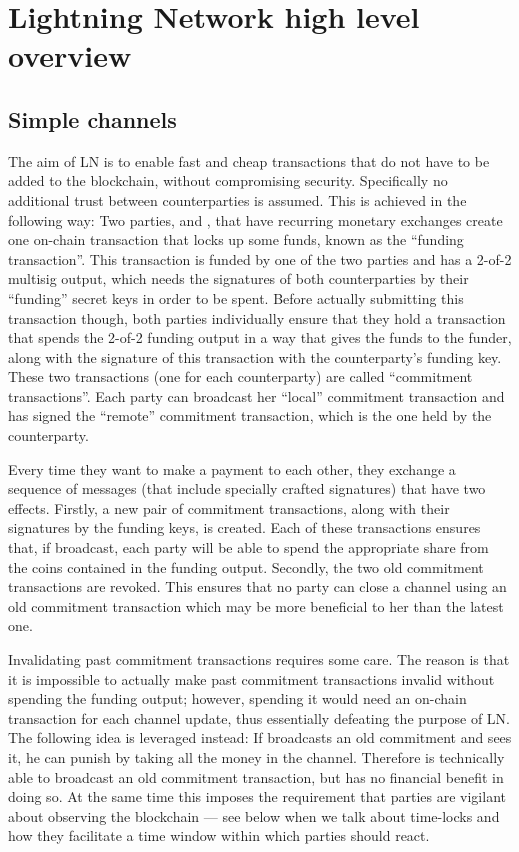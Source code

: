 \section{Lightning Network high level overview}
  \subsection{Simple channels}
    The aim of LN is to enable fast and cheap transactions that do not have to
    be added to the blockchain, without compromising security. Specifically no
    additional trust between counterparties is assumed. This is achieved in the
    following way: Two parties, \alice{} and \bob, that have recurring monetary
    exchanges create one on-chain transaction that locks up some funds, known as
    the ``funding transaction''. This transaction is funded by one of the two
    parties and has a 2-of-2 multisig output, which needs the signatures of both
    counterparties by their ``funding'' secret keys in order to be spent.
    Before actually submitting this transaction though, both parties
    individually ensure that they hold a transaction that spends the 2-of-2
    funding output in a way that gives the funds to the funder, along with the
    signature of this transaction with the counterparty's funding key. These two
    transactions (one for each counterparty) are called ``commitment
    transactions''. Each party can broadcast her ``local'' commitment
    transaction and has signed the ``remote'' commitment transaction, which is
    the one held by the counterparty.

    Every time they want to make a payment to each other, they exchange a
    sequence of messages (that include specially crafted signatures) that have
    two effects.  Firstly, a new pair of commitment transactions, along with
    their signatures by the funding keys, is created. Each of these transactions
    ensures that, if broadcast, each party will be able to spend the appropriate 
    share from the coins contained in the funding output.  Secondly, the two old
    commitment transactions are revoked.  This ensures that no party can close a
    channel using an old commitment transaction which may be
    more beneficial to her than the latest one.

    Invalidating past commitment transactions requires some care. The reason is that
    it is impossible to actually make past commitment transactions
    invalid without spending the funding output; however, spending it would need an
    on-chain transaction for each channel 
    update, thus essentially defeating the purpose of LN. The
    following idea is leveraged instead: If \alice{} broadcasts an old
    commitment and \bob{} sees it, he can punish \alice{} by taking all the
    money in the channel. Therefore \alice{} is technically able to broadcast an
    old commitment transaction, but has no financial benefit in doing so. 
    At the same time this imposes the requirement that parties are vigilant about
    observing the blockchain --- see below when we talk about time-locks and how 
    they facilitate a  time window within which  parties should react.
    
